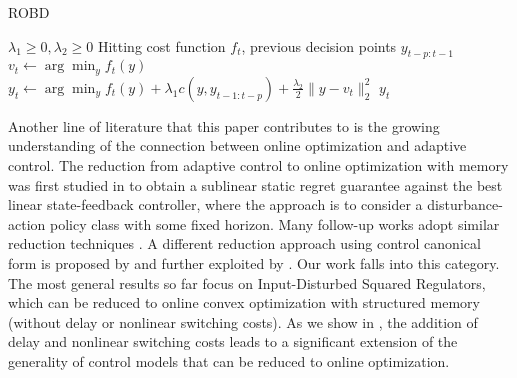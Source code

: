 \begin{algorithm}[t!]
  \caption{ROBD \citep{goel2019beyond}}
  \label{robd}
\begin{algorithmic}[1]
   $\lambda_1\ge0,\lambda_2\ge0$
   Hitting cost function $f_t$, previous decision points $y_{t-p:t-1}$
  \STATE $v_t\leftarrow\arg\min_yf_t(y)$
  \STATE $y_t\leftarrow\arg\min_yf_t(y)+\lambda_1c(y,y_{t-1:t-p})+\frac{\lambda_2}{2}\|y-v_t\|^2_2$
   $y_t$
  \ENDFOR
   
\end{algorithmic}
\end{algorithm}

Another line of literature that this paper contributes to is the growing understanding of the connection between online optimization and adaptive control. The reduction from adaptive control to online optimization with memory was first studied in \citep{agarwal2019online} to obtain a sublinear static regret guarantee against the best linear state-feedback controller, where the approach is to consider a disturbance-action policy class with some fixed horizon.  Many follow-up works adopt similar reduction techniques \citep{agarwal2019logarithmic, brukhim2020online, gradu2020adaptive}. A different reduction approach using control canonical form is proposed by \citep{li2019online} and further exploited by \citep{shi2020online}. Our work falls into this category.  The most general results so far focus on Input-Disturbed Squared Regulators, which can be reduced to online convex optimization with structured memory (without delay or nonlinear switching costs).  As we show in , the addition of delay and nonlinear switching costs leads to a significant extension of the generality of control models that can be reduced to online optimization. 